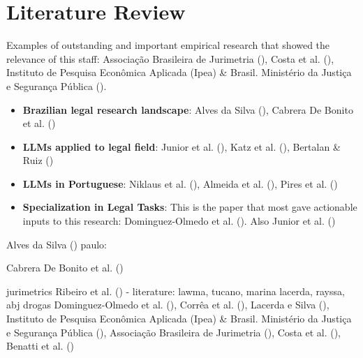\documentclass[
  12pt,
]{article}
\providecommand{\tightlist}{%
  \setlength{\itemsep}{0pt}\setlength{\parskip}{0pt}}\usepackage{longtable,booktabs,array}
\begin{document}
\section{Literature Review}\label{literature-review}

Examples of outstanding and important empirical research that showed the
relevance of this staff: Associação Brasileira de Jurimetria
(),
Costa et al. (), Instituto de
Pesquisa Econômica Aplicada (Ipea) \& Brasil. Ministério da Justiça e
Segurança Pública
().

\begin{itemize}
\tightlist
\item
  \textbf{Brazilian legal research landscape}: Alves da Silva
  (), Cabrera De Bonito
  et al. ()
\item
  \textbf{LLMs applied to legal field}: Junior et al.
  (), Katz et al.
  (), Bertalan \& Ruiz
  ()
\item
  \textbf{LLMs in Portuguese}: Niklaus et al.
  (), Almeida et al.
  (), Pires et al.
  ()
\item
  \textbf{Specialization in Legal Tasks}: This is the paper that most
  gave actionable inputs to this research: Dominguez-Olmedo et al.
  (). Also Junior et al.
  ()
\end{itemize}

Alves da Silva ()
paulo:

Cabrera De Bonito et al.
()

jurimetrics Ribeiro et al.
() - literature: lawma,
tucano, marina lacerda, rayssa, abj drogas Dominguez-Olmedo et al.
(), Corrêa et al.
(), Lacerda e Silva
(), Instituto de
Pesquisa Econômica Aplicada (Ipea) \& Brasil. Ministério da Justiça e
Segurança Pública
(),
Associação Brasileira de Jurimetria
(),
Costa et al. (), Benatti et al.
()
\end{document}
